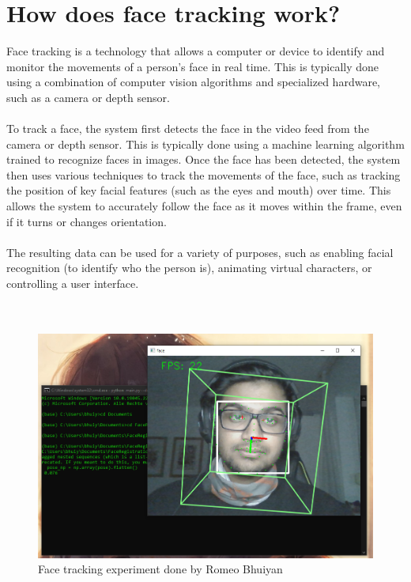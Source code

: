 \section{How does face tracking work?}
Face tracking is a technology that allows a computer or device to identify and monitor the movements of a person's face in real time. This is typically done using a combination of computer vision algorithms and specialized hardware, such as a camera or depth sensor.
\\
\\
To track a face, the system first detects the face in the video feed from the camera or depth sensor. This is typically done using a machine learning algorithm trained to recognize faces in images. Once the face has been detected, the system then uses various techniques to track the movements of the face, such as tracking the position of key facial features (such as the eyes and mouth) over time. This allows the system to accurately follow the face as it moves within the frame, even if it turns or changes orientation.
\\
\\
The resulting data can be used for a variety of purposes, such as enabling facial recognition (to identify who the person is), animating virtual characters, or controlling a user interface.
\\
\\
\\
\begin{figure}[htb]
    \includegraphics[width=1\textwidth]{pics/bhuiyanfracetracking.png}
    \caption{Face tracking experiment done by Romeo Bhuiyan}
\end{figure}
\\
\\
\\

